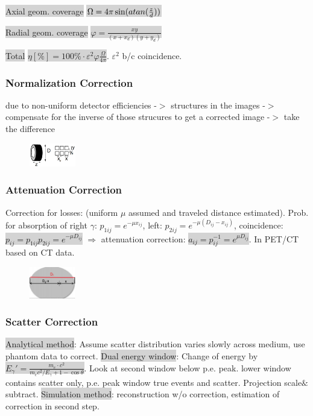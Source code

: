 \documentclass[9pt]{article}
\newcommand{\grey}[1]{\setlength{\fboxsep}{0pt}\colorbox{lightgrey}{#1}}
\begin{document}
\begin{multicols}{2}
\grey{Axial geom. coverage} \grey{$\Omega =4\pi\sin(atan({z \over d}))$}

\grey{Radial geom. coverage} \grey{$\varphi = \frac{xy}{(x+x_d)(y+y_d)}$}

\grey{Total} \grey{$\eta[\%] = 100\% \cdot \varepsilon^2 \varphi \frac{\Omega}{4\pi}$}.
$\varepsilon^2$ b/c coincidence.

\subsubsection{Normalization Correction} due to non-uniform detector efficiencies -$>$ structures in the images -$>$ compensate for the inverse of those strucures to get a corrected image -$>$ take the difference
\begin{figure}
	\vspace{-6mm}
	\includegraphics[width=2cm,]{geometricefficiency.png}
\end{figure}

\subsubsection{Attenuation Correction}
Correction for losses: (uniform $\mu$ assumed and traveled distance estimated). Prob. for absorption of right $\gamma$: $p_{1ij} = e^{-\mu x_{ij}}$, left: $p_{2ij} = e^{-\mu(D_{ij}-x_{ij})}$, coincidence: \grey{$p_{ij} = p_{1ij}p_{2ij} = e^{-\mu D_{ij}}$} $\Rightarrow$ attenuation correction: \grey{$a_{ij}=p_{ij}^{-1}=e^{\mu D_{ij}}$}. In PET/CT based on CT data.
\begin{figure}
	\vspace{-4mm}
	\includegraphics[width=2cm,]{attenuationcorrection.png}
\end{figure}
\subsubsection{Scatter Correction} \grey{Analytical method}: Assume scatter distribution varies slowly across medium, use phantom data to correct. \grey{Dual energy window}: Change of energy by \grey{$E_{\gamma}' = \frac{m_e \cdot c^2}{m_e c^2 / E_\gamma + 1 - \cos \theta}$}. Look at second window below p.e. peak. lower window contains scatter only, p.e. peak window true events and scatter. Projection scale$\&$subtract. \grey{Simulation method}: reconstruction w/o correction, estimation of correction in second step.


\end{multicols}
\end{document}
